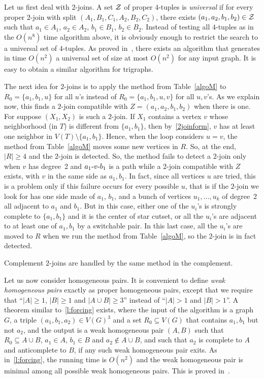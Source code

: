 \documentclass[11 pt] {article}
\def\d{\hbox{-}}
\begin{document}
Let us first deal with $2$-joins.  A set $\cal Z$ of proper $4$-tuples
is \emph{universal} if for every proper $2$-join with split $(A_1,
B_1, C_1, A_2, B_2, C_2)$, there exists $(a_1, a_2, b_1, b_2) \in
{\cal Z}$ such that $a_1 \in A_1$, $a_2 \in A_2$, $b_1 \in B_1$, $b_2
\in B_2$.  Instead of testing all $4$-tuples as in the $O(n^8)$ time
algorithm above, it is obviously enough to restrict the search to a
universal set of $4$-tuples.  As proved in~\cite{ChHaTrVu:2-join},
there exists an algorithm that generates in time $O(n^2)$ a universal
set of size at most $O(n^2)$ for any input graph.  It is easy to
obtain a similar algorithm for trigraphs.

The next idea for $2$-joins is to apply the method from
Table~\ref{algoM} to $R_0=\{ a_1, b_1, u\}$ for all $u$'s instead of
$R_0=\{ a_1, b_1, u, v\}$ for all $u, v$'s.  As we explain now, this
finds a $2$-join compatible with $Z = (a_1, a_2, b_1, b_2)$ when there
is one.  For suppose $(X_1, X_2)$ is such a $2$-join.  If $X_1$ contains
a vertex $v$ whose neighborhood (in $T$) is different from $\{a_1,
b_1\}$, then by~\ref{2joinform}, $v$ has at least one neighbor in
$V(T) \setminus \{a_1, b_1\}$.  Hence, when the loop considers $u=v$,
the method from Table~\ref{algoM} moves some new vertices in $R$.  So,
at the end, $|R| \geq 4$ and the $2$-join is detected.  So, the method
fails to detect a $2$-join only when $v$ has degree~2 and $a_1 \d v \d
b_1$ is a path while a $2$-join compatible with $Z$ exists, with $v$
in the same side as $a_1, b_1$.  In fact, since all vertices $u$ are
tried, this is a problem only if this failure occurs for every
possible $u$, that is if the $2$-join we look for has one side made of
$a_1$, $b_1$, and a bunch of vertices $u_1, \dots, u_k$ of degree~2
all adjacent to $a_1$ and $b_1$.  But in this case, either one of the
$u_i$'s is strongly complete to $\{a_1, b_1\}$ and it is the center of
star cutset, or all the $u_i$'s are adjacent to at least one of $a_1,
b_1$ by a switchable pair.  In this last case, all the $u_i$'s are
moved to $R$ when we run the method from Table~\ref{algoM}, so the
$2$-join is in fact detected.

Complement $2$-joins are handled by the same method in the complement.

Let us now consider homogeneous pairs.  It is convenient to define
\emph{weak homogeneous pairs} exactly as proper homogeneous pairs,
except that we require that ``$|A|\geq 1$, $|B|\geq 1$ and $|A\cup B|
\geq 3$'' instead of ``$|A|>1$ and $|B|>1$''.  A theorem similar
to~\ref{l:forcing} exists, where the input of the algorithm is a graph
$G$, a triple $(a_1, b_1, a_2) \in V(G)^3$ and a set $R_0\subseteq
V(G)$ that contains $a_1, b_1$ but not $a_2$, and the output is a weak
homogeneous pair $(A, B)$ such that $R_0 \subseteq A \cup B$, $a_1 \in
A$, $b_1\in B$ and $a_2\notin A\cup B$, and such that $a_2$ is
complete to $A$ and anticomplete to $B$, if any such weak homogeneous
pair exits.  As in~\ref{l:forcing}, the running time is $O(n^2)$ and
the weak homogeneous pair is minimal among all possible weak
homogeneous pairs.  This is proved in~\cite{everett.k.r:findingHP}.
\end{document}
